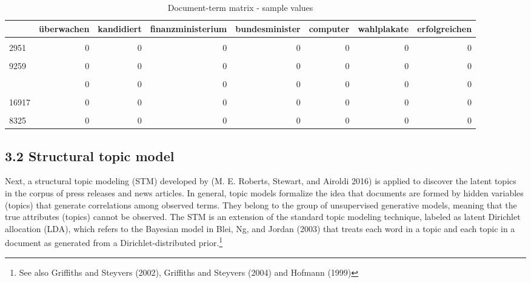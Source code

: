 \documentclass[
  12pt,
]{article}
\begin{document}
\begin{table}[H]

\caption{\label{tab:Document term matrix}Document-term matrix - sample values \label{table:dtm}}
\centering
\fontsize{7}{9}\selectfont
\begin{tabular}[t]{lrrrrrrr}
\toprule
  & überwachen & kandidiert & finanzministerium & bundesminister & computer & wahlplakate & erfolgreichen\\
\midrule
\cellcolor{gray!6}{10319} & \cellcolor{gray!6}{0} & \cellcolor{gray!6}{0} & \cellcolor{gray!6}{0} & \cellcolor{gray!6}{0} & \cellcolor{gray!6}{0} & \cellcolor{gray!6}{0} & \cellcolor{gray!6}{0}\\
2951 & 0 & 0 & 0 & 0 & 0 & 0 & 0\\
\cellcolor{gray!6}{6733} & \cellcolor{gray!6}{0} & \cellcolor{gray!6}{0} & \cellcolor{gray!6}{0} & \cellcolor{gray!6}{0} & \cellcolor{gray!6}{0} & \cellcolor{gray!6}{0} & \cellcolor{gray!6}{0}\\
9259 & 0 & 0 & 0 & 0 & 0 & 0 & 0\\
\cellcolor{gray!6}{16017} & \cellcolor{gray!6}{0} & \cellcolor{gray!6}{0} & \cellcolor{gray!6}{0} & \cellcolor{gray!6}{0} & \cellcolor{gray!6}{0} & \cellcolor{gray!6}{0} & \cellcolor{gray!6}{0}\\
\addlinespace
16742 & 0 & 0 & 0 & 0 & 0 & 0 & 0\\
\cellcolor{gray!6}{2041} & \cellcolor{gray!6}{0} & \cellcolor{gray!6}{0} & \cellcolor{gray!6}{0} & \cellcolor{gray!6}{0} & \cellcolor{gray!6}{1} & \cellcolor{gray!6}{0} & \cellcolor{gray!6}{0}\\
16917 & 0 & 0 & 0 & 0 & 0 & 0 & 0\\
\cellcolor{gray!6}{16850} & \cellcolor{gray!6}{0} & \cellcolor{gray!6}{0} & \cellcolor{gray!6}{0} & \cellcolor{gray!6}{0} & \cellcolor{gray!6}{0} & \cellcolor{gray!6}{0} & \cellcolor{gray!6}{0}\\
8325 & 0 & 0 & 0 & 0 & 0 & 0 & 0\\
\bottomrule
\end{tabular}
\end{table}

\hypertarget{structural-topic-model}{%
\subsection{3.2 Structural topic model}\label{structural-topic-model}}

Next, a structural topic modeling (STM) developed by (M. E. Roberts,
Stewart, and Airoldi 2016) is applied to discover the latent topics in
the corpus of press releases and news articles. In general, topic models
formalize the idea that documents are formed by hidden variables
(topics) that generate correlations among observed terms. They belong to
the group of unsupervised generative models, meaning that the true
attributes (topics) cannot be observed. The STM is an extension of the
standard topic modeling technique, labeled as latent Dirichlet
allocation (LDA), which refers to the Bayesian model in Blei, Ng, and
Jordan (2003) that treats each word in a topic and each topic in a
document as generated from a Dirichlet-distributed prior.\footnote{See
  also Griffiths and Steyvers (2002), Griffiths and Steyvers (2004) and
  Hofmann (1999)}
\end{document}
